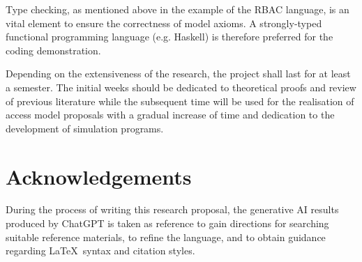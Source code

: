 \documentclass{article}
\begin{document}
Type checking, as mentioned above in the example of the RBAC language, is an
vital element to ensure the correctness of model axioms. A strongly-typed
functional programming language (e.g. Haskell) is therefore preferred for
the coding demonstration.

Depending on the extensiveness of the research, the project shall last for
at least a semester. The initial weeks should be dedicated to theoretical
proofs and review of previous literature while the subsequent time will be
used for the realisation of access model proposals with a gradual increase
of time and dedication to the development of simulation programs.

\newpage

 

\section*{Acknowledgements}

During the process of writing this research proposal, the generative AI
results produced by ChatGPT is taken as reference to gain directions for
searching suitable reference materials, to refine the language, and to obtain
guidance regarding \LaTeX\ syntax and citation styles.
\end{document}
